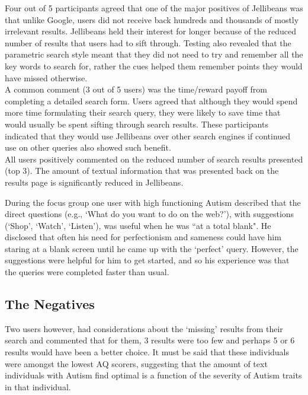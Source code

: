 \documentclass[a4paper, 11pt]{article}
\begin{document}
Four out of 5 participants agreed that one of the major positives of Jellibeans was that unlike Google, users did not receive back hundreds and thousands of mostly irrelevant results. Jellibeans held their interest for longer because of the reduced number of results that users had to sift through. Testing also revealed that the parametric search style meant that they did not need to try and remember all the key words to search for, rather the cues helped them remember points they would have missed otherwise. \\

\vspace{5mm}
A common comment (3 out of 5 users) was the time/reward payoff from completing a detailed search form. Users agreed that although they would spend more time formulating their search query, they were likely to save time that would usually be spent sifting through search results. These participants indicated that they would use Jellibeans over other search engines if continued use on other queries also showed such benefit.\\

\vspace{5mm}
All users positively commented on the reduced number of search results presented (top 3). The amount of textual information that was presented back on the results page is significantly reduced in Jellibeans. 

\vspace{5mm}
During the focus group one user with high functioning Autism described that the direct questions (e.g., `What do you want to do on the web?'), with suggestions (`Shop', `Watch', `Listen'), was useful when he was ``at a total blank". He disclosed that often his need for perfectionism and sameness could have him staring at a blank screen until he came up with the `perfect' query. However, the suggestions were helpful for him to get started, and so his experience was that the queries were completed faster than usual.  \\

\subsection{The Negatives}

Two users however, had considerations about the `missing' results from their search and commented that for them, 3 results were too few and perhaps 5 or 6 results would have been a better choice. It must be said that these individuals were amongst the lowest AQ scorers, suggesting that the amount of text individuals with Autism find optimal is a function of the severity of Autism traits in that individual.
\end{document}
